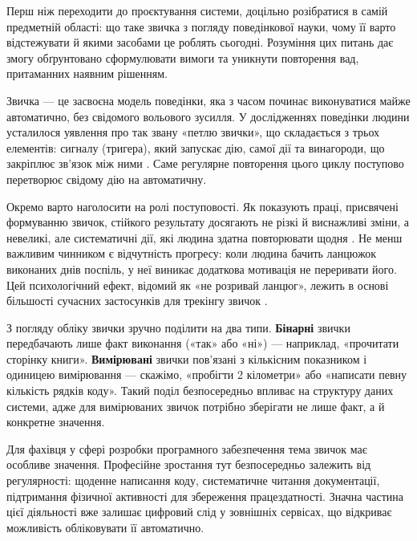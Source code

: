 
Перш ніж переходити до проєктування системи, доцільно розібратися в самій предметній області: що таке звичка з погляду поведінкової науки, чому її варто відстежувати й якими засобами це роблять сьогодні. Розуміння цих питань дає змогу обґрунтовано сформулювати вимоги та уникнути повторення вад, притаманних наявним рішенням.


Звичка — це засвоєна модель поведінки, яка з часом починає виконуватися майже автоматично, без свідомого вольового зусилля. У дослідженнях поведінки людини усталилося уявлення про так звану «петлю звички», що складається з трьох елементів: сигналу (тригера), який запускає дію, самої дії та винагороди, що закріплює зв'язок між ними . Саме регулярне повторення цього циклу поступово перетворює свідому дію на автоматичну.

Окремо варто наголосити на ролі поступовості. Як показують праці, присвячені формуванню звичок, стійкого результату досягають не різкі й виснажливі зміни, а невеликі, але систематичні дії, які людина здатна повторювати щодня . Не менш важливим чинником є відчутність прогресу: коли людина бачить ланцюжок виконаних днів поспіль, у неї виникає додаткова мотивація не переривати його. Цей психологічний ефект, відомий як «не розривай ланцюг», лежить в основі більшості сучасних застосунків для трекінгу звичок .

З погляду обліку звички зручно поділити на два типи. \textbf{Бінарні} звички передбачають лише факт виконання («так» або «ні») — наприклад, «прочитати сторінку книги». \textbf{Вимірювані} звички пов'язані з кількісним показником і одиницею вимірювання — скажімо, «пробігти 2 кілометри» або «написати певну кількість рядків коду». Такий поділ безпосередньо впливає на структуру даних системи, адже для вимірюваних звичок потрібно зберігати не лише факт, а й конкретне значення.

Для фахівця у сфері розробки програмного забезпечення тема звичок має особливе значення. Професійне зростання тут безпосередньо залежить від регулярності: щоденне написання коду, систематичне читання документації, підтримання фізичної активності для збереження працездатності. Значна частина цієї діяльності вже залишає цифровий слід у зовнішніх сервісах, що відкриває можливість обліковувати її автоматично.


